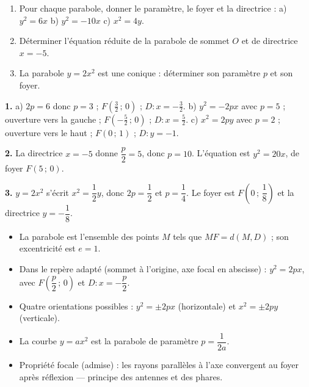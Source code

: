 \documentclass[11pt]{article}
\begin{document}
\begin{exercice}
\begin{enumerate}
\item Pour chaque parabole, donner le paramètre, le foyer et la directrice : \quad a) $y^2 = 6x$ \quad b) $y^2 = -10x$ \quad c) $x^2 = 4y$.
\item Déterminer l'équation réduite de la parabole de sommet $O$ et de directrice $x = -5$.
\item La parabole $y = 2x^2$ est une conique : déterminer son paramètre $p$ et son foyer.
\end{enumerate}
\end{exercice}

\begin{corrige}
\textbf{1.} a) $2p = 6$ donc $p = 3$ ; $F\left(\tfrac{3}{2}\,;\,0\right)$ ; $D : x = -\tfrac{3}{2}$. \quad b) $y^2 = -2px$ avec $p = 5$ ; ouverture vers la gauche ; $F\left(-\tfrac{5}{2}\,;\,0\right)$ ; $D : x = \tfrac{5}{2}$. \quad c) $x^2 = 2py$ avec $p = 2$ ; ouverture vers le haut ; $F(0\,;\,1)$ ; $D : y = -1$.

\textbf{2.} La directrice $x = -5$ donne $\dfrac{p}{2} = 5$, donc $p = 10$. L'équation est $y^2 = 20x$, de foyer $F(5\,;\,0)$.

\textbf{3.} $y = 2x^2$ s'écrit $x^2 = \dfrac{1}{2}y$, donc $2p = \dfrac{1}{2}$ et $p = \dfrac{1}{4}$. Le foyer est $F\left(0\,;\,\dfrac{1}{8}\right)$ et la directrice $y = -\dfrac{1}{8}$.
\end{corrige}

\begin{aretenir}
\begin{itemize}
\item La parabole est l'ensemble des points $M$ tels que $MF = d(M,D)$ ; son excentricité est $e = 1$.
\item Dans le repère adapté (sommet à l'origine, axe focal en abscisse) : $y^2 = 2px$, avec $F\left(\dfrac{p}{2}\,;\,0\right)$ et $D : x = -\dfrac{p}{2}$.
\item Quatre orientations possibles : $y^2 = \pm 2px$ (horizontale) et $x^2 = \pm 2py$ (verticale).
\item La courbe $y = ax^2$ est la parabole de paramètre $p = \dfrac{1}{2a}$.
\item Propriété focale (admise) : les rayons parallèles à l'axe convergent au foyer après réflexion — principe des antennes et des phares.
\end{itemize}
\end{aretenir}
\end{document}
